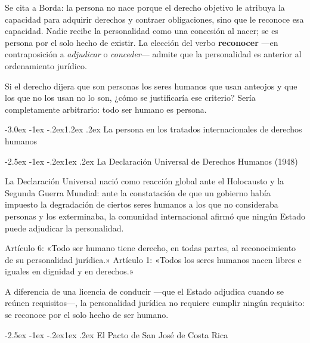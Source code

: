 \documentclass[12pt,oneside]{book}
\makeatletter
\renewcommand\section{\@startsection{section}{1}{\z@}%
  {-3.0ex \@plus -1ex \@minus -.2ex}{1.2ex \@plus .2ex}%
  {\normalfont\large\bfseries\color{acento}}}
\renewcommand\subsection{\@startsection{subsection}{2}{\z@}%
  {-2.5ex \@plus -1ex \@minus -.2ex}{1ex \@plus .2ex}%
  {\normalfont\normalsize\bfseries}}
\makeatother
\begin{document}
Se cita a Borda: la persona no nace porque el derecho objetivo le atribuya la capacidad para adquirir derechos y contraer obligaciones, sino que le reconoce esa capacidad. Nadie recibe la personalidad como una concesión al nacer; se es persona por el solo hecho de existir. La elección del verbo \textbf{reconocer} ---en contraposición a \emph{adjudicar} o \emph{conceder}--- admite que la personalidad es anterior al ordenamiento jurídico.

\begin{ejemplo}
Si el derecho dijera que son personas los seres humanos que usan anteojos y que los que no los usan no lo son, ¿cómo se justificaría ese criterio? Sería completamente arbitrario: todo ser humano es persona.
\end{ejemplo}

\section{La persona en los tratados internacionales de derechos humanos}

\subsection{La Declaración Universal de Derechos Humanos (1948)}

La Declaración Universal nació como reacción global ante el Holocausto y la Segunda Guerra Mundial: ante la constatación de que un gobierno había impuesto la degradación de ciertos seres humanos a los que no consideraba personas y los exterminaba, la comunidad internacional afirmó que ningún Estado puede adjudicar la personalidad.

\begin{importante}
Artículo 6: «Todo ser humano tiene derecho, en todas partes, al reconocimiento de su personalidad jurídica.»
Artículo 1: «Todos los seres humanos nacen libres e iguales en dignidad y en derechos.»
\end{importante}

A diferencia de una licencia de conducir ---que el Estado adjudica cuando se reúnen requisitos---, la personalidad jurídica no requiere cumplir ningún requisito: se reconoce por el solo hecho de ser humano.

\subsection{El Pacto de San José de Costa Rica}
\end{document}
